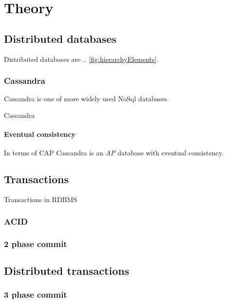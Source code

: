
\chapter{Theory}\label{chapter:theory}

\section{Distributed databases}\label{sec:theory:distDbs}
Distributed databases are .. \ref{fig:hierarchyElements}. \cite{CassandraDataStaxDocs} \cite{chandra2007PaxosMadeLive} \cite{lamport1982byzantine}

\subsection{Cassandra}
Cassandra is one of more widely used NoSql databases. 

Cassandra

\subsubsection{Eventual consistency}\label{sec:theory:eventualConsistency}
In terms of CAP \cite{brewer2000towards} \cite{Brewer:2012ba} Cassandra is an \emph{AP} database with eventual consistency.


\section{Transactions}\label{sec:theory:transactions}
Transactions in RDBMS

\subsection{ACID}

\subsection{2 phase commit}

\section{Distributed transactions}

\subsection{3 phase commit}\label{sec:theory:transactions:3pc}


